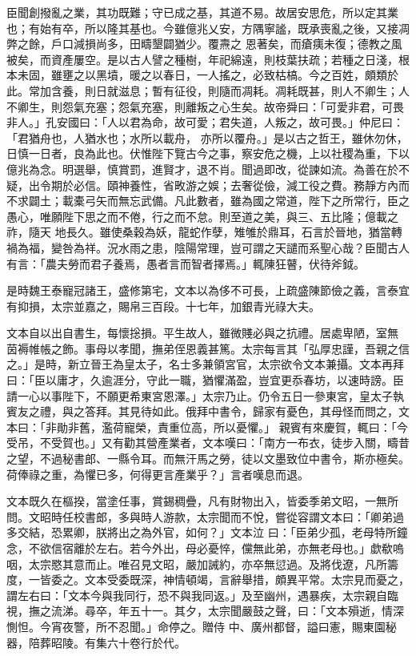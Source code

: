 \begin{pinyinscope}
 臣聞創撥亂之業，其功既難；守已成之基，其道不易。故居安思危，所以定其業也；有始有卒，所以隆其基也。今雖億兆乂安，方隅寧謐，既承喪亂之後，又接凋弊之餘，戶口減損尚多，田疇墾闢猶少。覆燾之
 恩著矣，而瘡痍未復；德教之風被矣，而資產屢空。是以古人譬之種樹，年祀綿遠，則枝葉扶疏；若種之日淺，根本未固，雖壅之以黑墳，暖之以春日，一人搖之，必致枯槁。今之百姓，頗類於此。常加含養，則日就滋息；暫有征役，則隨而凋耗。凋耗既甚，則人不卿生；人不卿生，則怨氣充塞；怨氣充塞，則離叛之心生矣。故帝舜曰：「可愛非君，可畏非人。」孔安國曰：「人以君為命，故可愛；君失道，人叛之，故可畏。」仲尼曰：「君猶舟也，人猶水也；水所以載舟，
 亦所以覆舟。」是以古之哲王，雖休勿休，日慎一日者，良為此也。伏惟陛下覽古今之事，察安危之機，上以社稷為重，下以億兆為念。明選舉，慎賞罰，進賢才，退不肖。聞過即改，從諫如流。為善在於不疑，出令期於必信。頤神養性，省畋游之娛；去奢從儉，減工役之費。務靜方內而不求闢土；載橐弓矢而無忘武備。凡此數者，雖為國之常道，陛下之所常行，臣之愚心，唯願陛下思之而不倦，行之而不怠。則至道之美，與三、五比隆；億載之祚，隨天
 地長久。雖使桑穀為妖，龍蛇作孽，雉雊於鼎耳，石言於晉地，猶當轉禍為福，變咎為祥。況水雨之患，陰陽常理，豈可謂之天譴而系聖心哉？臣聞古人有言：「農夫勞而君子養焉，愚者言而智者擇焉。」輒陳狂瞽，伏待斧鉞。



 是時魏王泰寵冠諸王，盛修第宅，文本以為侈不可長，上疏盛陳節儉之義，言泰宜有抑損，太宗並嘉之，賜帛三百段。十七年，加銀青光祿大夫。



 文本自以出自書生，每懷捴損。平生故人，雖微賤必與之抗禮。居處卑陋，室無
 茵褥帷帳之飾。事母以孝聞，撫弟侄恩義甚篤。太宗每言其「弘厚忠謹，吾親之信之。」是時，新立晉王為皇太子，名士多兼領宮官，太宗欲令文本兼攝。文本再拜曰：「臣以庸才，久逾涯分，守此一職，猶懼滿盈，豈宜更忝春坊，以速時謗。臣請一心以事陛下，不願更希東宮恩澤。」太宗乃止。仍令五日一參東宮，皇太子執賓友之禮，與之答拜。其見待如此。俄拜中書令，歸家有憂色，其母怪而問之，文本曰：「非勛非舊，濫荷寵榮，責重位高，所以憂懼。」
 親賓有來慶賀，輒曰：「今受吊，不受賀也。」又有勸其營產業者，文本嘆曰：「南方一布衣，徒步入關，疇昔之望，不過秘書郎、一縣令耳。而無汗馬之勞，徒以文墨致位中書令，斯亦極矣。荷俸祿之重，為懼已多，何得更言產業乎？」言者嘆息而退。



 文本既久在樞揆，當塗任事，賞錫稠疊，凡有財物出入，皆委季弟文昭，一無所問。文昭時任校書郎，多與時人游款，太宗聞而不悅，嘗從容謂文本曰：「卿弟過多交結，恐累卿，朕將出之為外官，如何？」文本泣
 曰：「臣弟少孤，老母特所鐘念，不欲信宿離於左右。若今外出，母必憂悴，儻無此弟，亦無老母也。」歔欷嗚咽，太宗愍其意而止。唯召見文昭，嚴加誡約，亦卒無愆過。及將伐遼，凡所籌度，一皆委之。文本受委既深，神情頓竭，言辭舉措，頗異平常。太宗見而憂之，謂左右曰：「文本今與我同行，恐不與我同返。」及至幽州，遇暴疾，太宗親自臨視，撫之流涕。尋卒，年五十一。其夕，太宗聞嚴鼓之聲，曰：「文本殞逝，情深惻怛。今宵夜警，所不忍聞。」命停之。贈侍
 中、廣州都督，謚曰憲，賜東園秘器，陪葬昭陵。有集六十卷行於代。




\end{pinyinscope}
